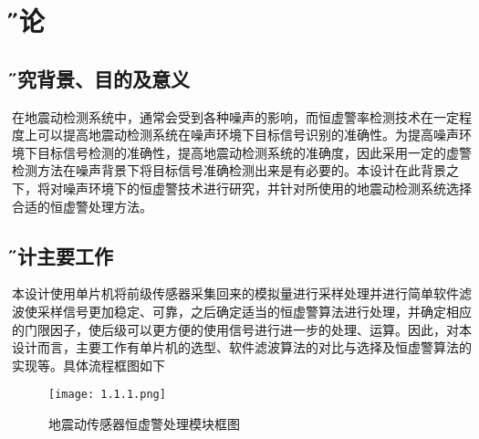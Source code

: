 \documentclass[12pt,a4paper]{article} %
\newcommand{\sihao}{\fontsize{14pt}{\baselineskip}\selectfont} %
\newcommand{\xiaosanhao}{\fontsize{15pt}{\baselineskip}\selectfont}    %
\begin{document}
\renewcommand{\contentsname}{\centerline{ \sihao \H 目\quad 录}}
  \tableofcontents 
    \newpage
  
     
 \section{\xiaosanhao \H 绪论}  
  
 	 \subsection{\H 研究背景、目的及意义}
在地震动检测系统中，通常会受到各种噪声的影响，而恒虚警率检测技术在一定程度上可以提高地震动检测系统在噪声环境下目标信号识别的准确性。为提高噪声环境下目标信号检测的准确性，提高地震动检测系统的准确度，因此采用一定的虚警检测方法在噪声背景下将目标信号准确检测出来是有必要的。本设计在此背景之下，将对噪声环境下的恒虚警技术进行研究，并针对所使用的地震动检测系统选择合适的恒虚警处理方法。
 	 
 	 
 	 \subsection{\H 设计主要工作}本设计使用单片机将前级传感器采集回来的模拟量进行采样处理并进行简单软件滤波使采样信号更加稳定、可靠，之后确定适当的恒虚警算法进行处理，并确定相应的门限因子，使后级可以更方便的使用信号进行进一步的处理、运算。因此，对本设计而言，主要工作有单片机的选型、软件滤波算法的对比与选择及恒虚警算法的实现等。具体流程框图如下
 	 
 	 \begin{figure}[htbp] %
 		  \centering
 		  \texttt{[image: 1.1.1.png]} 
  		  \caption{地震动传感器恒虚警处理模块框图 }
  		 \label{fig:1.1.1}

		\end{figure}
 	 
 	 
\end{document}

